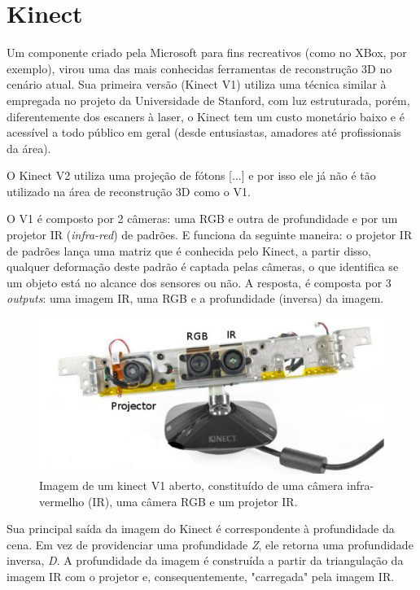 \chapter{Kinect}\label{sec:kinect}
Um componente criado pela Microsoft para fins recreativos (como no XBox, por exemplo), virou uma das mais conhecidas ferramentas de reconstrução 3D no cenário atual. Sua primeira versão (Kinect V1) utiliza uma técnica similar à empregada no projeto da Universidade de Stanford, com luz estruturada, porém, diferentemente dos escaners à laser, o Kinect tem um custo monetário baixo e é acessível a todo público em geral (desde entusiastas, amadores até profissionais da área). 

O Kinect V2 utiliza uma projeção de fótons [...] e por isso ele já não é tão utilizado na área de reconstrução 3D como o V1. 

O V1 é composto por 2 câmeras: uma RGB e outra de profundidade e por um projetor IR ({\it infra-red}) de padrões. E funciona da seguinte maneira: o projetor IR de padrões lança uma matriz que é conhecida pelo Kinect, a partir disso, qualquer deformação deste padrão é captada pelas câmeras, o que identifica se um objeto está no alcance dos sensores ou não. A resposta, é composta por 3 {\it outputs}: uma imagem IR,  uma RGB e a profundidade (inversa) da imagem.

\begin{figure}[!h]
	\centering
	\includegraphics[width=0.5\linewidth]{figs/kinect.png}
	\caption{%
	Imagem de um kinect V1 aberto, constituído de uma câmera infra-vermelho (IR), uma câmera RGB e um projetor IR.
	}\label{fig:kinect}
\end{figure}

Sua principal saída da imagem do Kinect é correspondente à profundidade da cena. Em vez de providenciar uma profundidade {\it Z}, ele retorna uma profundidade inversa, {\it D}.
A profundidade da imagem é construída a partir da triangulação da imagem IR com o projetor e, consequentemente, "carregada" pela imagem IR.

